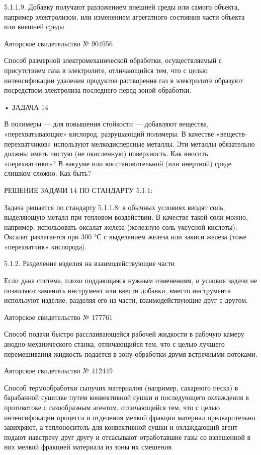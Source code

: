 5.1.1.9.  Добавку  получают  разложением   внешней  среды  или  самого
объекта, например  электролизом, или изменением  агрегатного состояния
части объекта или внешней среды

Авторское свидетельство № 904956

Способ  размерной  электромеханической   обработки,  осуществляемый  с
присутствием  газа  в  электролите,  отличающийся  тем,  что  с  целью
интенсификации  удаления  продуктов   растворения  газ  в  электролите
образуют посредством электролиза последнего перед зоной обработки.


• ЗАДАЧА 14

В   полимеры  —   для  повышения   стойкости  —   добавляют  вещества,
«перехватывающие»   кислород,   разрушающий   полимеры.   В   качестве
«веществ-перехватчиков»   используют   мелкодисперсные  металлы.   Эти
металлы обязательно  должны иметь чистую (не  окисленную) поверхность.
Как  вносить  «перехватчики»?  В вакууме  или  восстановительной  (или
инертной) среде слишком сложно. Как быть?


РЕШЕНИЕ ЗАДАЧИ 14 ПО СТАНДАРТУ 5.1.1:

Задача решается по стандарту 5.1.1.8:  в обычных условиях вводят соль,
выделяющую  металл при  тепловом  воздействии. В  качестве такой  соли
можно, например,  использовать оксалат железа (железную  соль уксусной
кислоты).  Оксалат разлагается  при  300 °С  с  выделением железа  или
закиси железа (тоже «перехватчик» кислорода).


5.1.2. Разделение изделия на взаимодействующие части

Если  дана система,  плохо  поддающаяся нужным  изменениям, и  условия
задачи   не  позволяют   заменить  инструмент   или  ввести   добавки,
вместо  инструмента   используют  изделие,  разделяя  его   на  части,
взаимодействующие друг с другом.

Авторское свидетельство № 177761

Способ подачи быстро расслаивающейся рабочей жидкости в рабочую камеру
анодно-механического  станка, отличающийся  тем, что  с целью  лучшего
перемешивания  жидкость подается  в  зону  обработки двумя  встречными
потоками.

Авторское свидетельство № 412449

Способ термообработки сыпучих материалов (например, сахарного песка) в
барабанной сушилке путем конвективной  сушки и последующего охлаждения
в  противотоке  с  газообразным   агентом,  отличающийся  тем,  что  с
целью  интенсификации процесса  и  отделения  мелкой фракции  материал
предварительно  завихряют,  а  теплоноситель  для  конвективной  сушки
и  охлаждающий   агент  подают  навстречу  друг   другу  и  отсасывают
отработавшие газы  со взвешенной  в них  мелкой фракцией  материала из
зоны их смешения.


